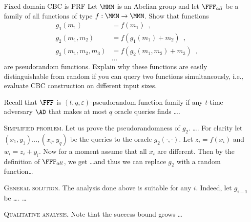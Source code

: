 \documentclass{crypto-exercise}
\author{Sven Laur}
\begin{document}
\begin{exercise}{Fixed domain CBC is PRF}
Let $\MMM$ is an Abelian group and let $\FFF_{all}$ be a family of all functions of type $f:\MMM\to\MMM$.
Show that functions 
\begin{align*}
g_1(m_1) &= f(m_1)\enspace,\\
g_2(m_1,m_2)&=f(g_1(m_1)+m_2)\enspace,\\
g_3(m_1,m_2,m_3)&=f(g_2(m_1,m_2)+m_3)\enspace, \\
&\ldots
\end{align*}
are pseudorandom functions. Explain why these functions are easily distinguishable from random if you can query two functions simultaneously, i.e., evaluate CBC construction on different input sizes.
\end{exercise}

\begin{solution}
Recall that $\FFF$ is $(t,q,\varepsilon)$-pseudorandom function family if any $t$-time adversary $\AD$ that makes at most $q$ oracle queries finds \ldots.

\vspace*{2ex}
\noindent
\textsc{Simplified problem.}
Let us prove the pseudorandomness of $g_2$. \ldots. 
For clarity let $(x_1,y_1)\ldots, (x_q, y_q)$ be the queries to the oracle $g_2(\cdot,\cdot)$.
Let $z_i=f(x_i)$ and $w_i=z_i+y_i$.
Now for a moment assume that all $x_i$ are different. 
Then by the definition of $\FFF_{all}$, we get \ldots  and thus we can replace $g_2$ with a random function\ldots


\vspace*{2ex}
\noindent
\textsc{General solution.}
The analysis done above is suitable for any $i$. Indeed, let $g_{i-1}$ be \ldots. 
 \ldots


\vspace*{2ex}
\noindent
\textsc{Qualitative analysis.} Note that the success bound grows \ldots 








\end{solution}
\end{document}
